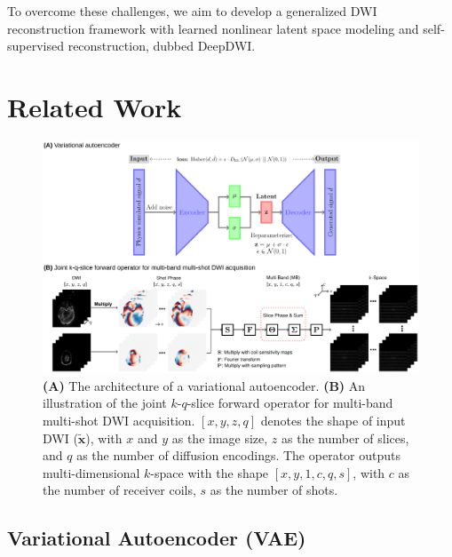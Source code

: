 \documentclass[journal,twoside,web]{ieeecolor}
\begin{document}
	To overcome these challenges,
	we aim to develop a generalized DWI reconstruction framework
	with learned nonlinear latent space modeling and
	self-supervised reconstruction,
	dubbed DeepDWI.


	\section{Related Work}

	\begin{figure}
		\centering
		\includegraphics[width=\textwidth]{../figures/fig1.png}
		\caption{\textbf{(A)} The architecture of a variational autoencoder.
			\textbf{(B)} An illustration of the joint $k$-$q$-slice forward operator
			for multi-band multi-shot DWI acquisition.
			$[x, y, z, q]$ denotes the shape of input DWI ($\mathbf{\tilde{x}}$),
			with $x$ and $y$ as the image size, $z$ as the number of slices,
			and $q$ as the number of diffusion encodings.
			The operator outputs multi-dimensional $k$-space with the shape $[x, y, 1, c, q, s]$,
			with $c$ as the number of receiver coils, $s$ as the number of shots.}
		\label{FIG:MODEL}
	\end{figure}

	\subsection{Variational Autoencoder (VAE)}
\end{document}
